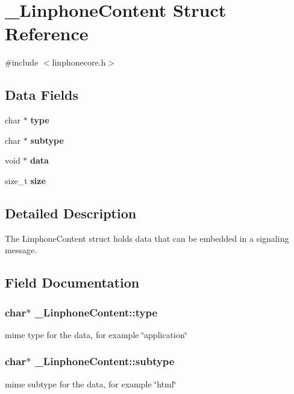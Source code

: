 \section{\-\_\-\-Linphone\-Content Struct Reference}
\label{struct__LinphoneContent}


{\ttfamily \#include $<$linphonecore.\-h$>$}

\subsection*{Data Fields}
\begin{DoxyCompactItemize}
\item 
char $\ast$ {\bf type}
\item 
char $\ast$ {\bf subtype}
\item 
void $\ast$ {\bf data}
\item 
size\-\_\-t {\bf size}
\end{DoxyCompactItemize}


\subsection{Detailed Description}
The Linphone\-Content struct holds data that can be embedded in a signaling message. 

\subsection{Field Documentation}
\subsubsection[{type}]{\setlength{\rightskip}{0pt plus 5cm}char$\ast$ \-\_\-\-Linphone\-Content\-::type}\label{struct__LinphoneContent_a8a86c24d70252b4c790085f8d5b94fdc}
mime type for the data, for example \char`\"{}application\char`\"{} 
\subsubsection[{subtype}]{\setlength{\rightskip}{0pt plus 5cm}char$\ast$ \-\_\-\-Linphone\-Content\-::subtype}\label{struct__LinphoneContent_a26cbb8fe30763eea41a5b84028dd1f9b}
mime subtype for the data, for example \char`\"{}html\char`\"{} 
